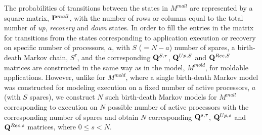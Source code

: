 \documentclass[conference,10pt]{IEEEtran}
\begin{document}
The probabilities of transitions between the states in $M^{mall}$ are
represented by a square matrix, ${\bf P}^{mall}$, with the number of
rows or columns equal to the total number of {\em up}, {\em recovery} and
{\em down} states. In order to fill the entries in the matrix for
transitions from the states corresponding to application execution or
recovery on specific number of processors, $a$, with $S$ ($=N-a$)
number of spares, a birth-death Markov chain, $S^{\tau}$, and the
corresponding ${\bf Q}^{S,\tau}$, ${\bf Q}^{Up,S}$ and ${\bf
  Q}^{Rec,S}$ matrices are constructed in the same way as in the
model, $M^{mold}$,  for moldable applications. However, unlike for
$M^{mold}$, where a single birth-death Markov model was constructed
for modeling execution on a fixed number of active processors, $a$
(with $S$ spares), we construct $N$ such birth-death Markov models for
$M^{mall}$ corresponding to execution on $N$ possible number of active
processors with the corresponding number of spares and obtain $N$
corresponding ${\bf Q}^{s,\tau}$, ${\bf Q}^{Up,s}$ and ${\bf
  Q}^{Rec,s}$ matrices, where $0\leq s<N$.
\end{document}
